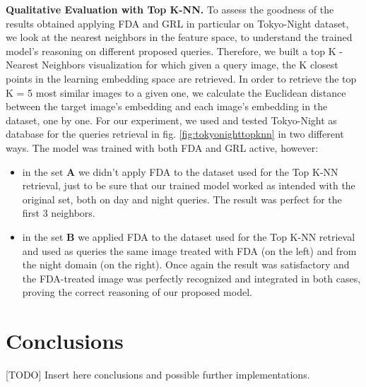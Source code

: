 \documentclass[10pt,twocolumn,letterpaper]{article}
\begin{document}
\textbf{Qualitative Evaluation with Top K-NN.}
To assess the goodness of the results obtained applying FDA and GRL in particular on Tokyo-Night dataset, we look at the nearest neighbors in the feature space, to understand the trained model's reasoning on different proposed queries. 
Therefore, we built a top K - Nearest Neighbors visualization
for which given a query image, the K closest points in the learning embedding space are retrieved.
In order to retrieve the top K = 5 most similar images to a given one, we calculate the Euclidean distance between the target image's embedding and each image's embedding in the dataset, one by one.
For our experiment, we used and tested Tokyo-Night as database for the queries retrieval in fig. \cref{fig:tokyonighttopknn} in two different ways.
The model was trained with both FDA and GRL active, however:
\begin{itemize}
    \item in the set \textbf{A} we didn't apply FDA to the dataset used for the Top K-NN retrieval, just to be sure that our trained model worked as intended with the original set, both on day and night queries. The result was perfect for the first 3 neighbors.
    \item in the set \textbf{B} we applied FDA to the dataset used for the Top K-NN retrieval and used as queries the same image treated with FDA (on the left) and from the night domain (on the right).
    Once again the result was satisfactory and the FDA-treated image was perfectly recognized and integrated in both cases, proving the correct reasoning of our proposed model.
\end{itemize}

\begin{figure*}
  \centering
  \begin{subfigure}{1.0\linewidth}
    \centering
  \end{subfigure}
      \caption{Given a target image, top 5 matching images are shown. Preset A) corresponds to Tokyo-Night dataset without FDA applied.
Preset B) corresponds to Tokyo-Night dataset with FDA applied on the target image on the left.}
  \hfill
  \label{fig:tokyonighttopknn}
\end{figure*}

\section{Conclusions}
[TODO] Insert here conclusions and possible further implementations.


{\small
\clearpage


}
\end{document}
